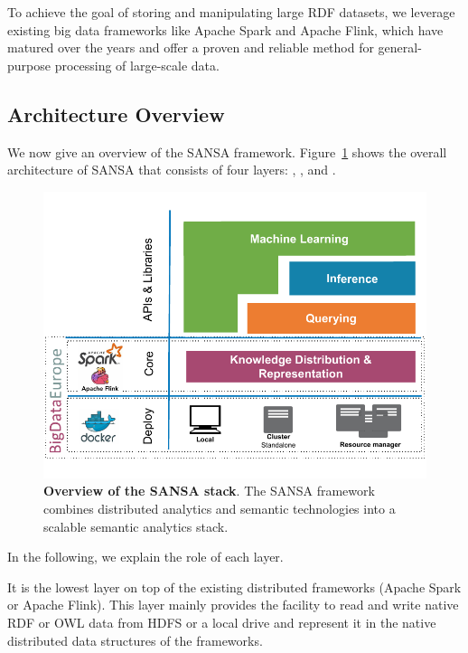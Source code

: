 To achieve the goal of storing and manipulating large \gls{RDF} datasets, we leverage existing big data frameworks like Apache Spark and Apache Flink, which have matured over the years and offer a proven and reliable method for general-purpose processing of large-scale data.

\subsection{Architecture Overview}
\label{sec:sansa-architecture}

We now give an overview of the SANSA framework.
Figure~\ref{fig:imp-use-cases-sansa-architecture} shows the overall architecture of SANSA that consists of four layers: , ,  and .

\begin{figure}
\centering 
	\includegraphics[width=0.95\columnwidth]{images/7_implemenation_and_usecases/sansa-architecture.pdf}
	\caption{\textbf{Overview of the SANSA stack}.
	The SANSA framework combines distributed analytics and semantic technologies into a scalable semantic analytics stack.}
	\label{fig:imp-use-cases-sansa-architecture}
\end{figure}

In the following, we explain the role of each layer.

It is the lowest layer on top of the existing distributed frameworks (Apache Spark or Apache Flink).
This layer mainly provides the facility to read and write native \gls{RDF} or \gls{OWL} data from \gls{HDFS} or a local drive and represent it in the native distributed data structures of the frameworks.

